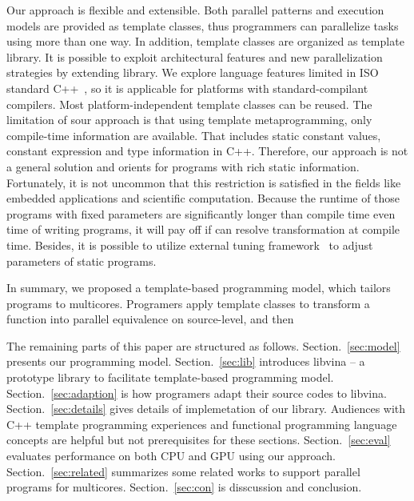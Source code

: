 Our approach is flexible and extensible. Both parallel patterns and
execution models are provided as template classes, thus programmers can
parallelize tasks using more than one way. In addition, template
classes are organized as template library. It is
possible to exploit architectural
features and new parallelization strategies by extending library. We
explore language features limited in ISO
standard C++~\cite{c++98, c++03, c++0x}, so it is applicable for
platforms with standard-compilant compilers. Most 
platform-independent template classes can be reused. The limitation of
sour approach is that using template metaprogramming, only compile-time
information are available. That includes static constant values,
constant expression and type information in C++. Therefore, our
approach is not a general solution and orients for programs with rich
static information. Fortunately, it is not uncommon that this
restriction is satisfied in the fields like embedded applications and
scientific computation. Because the runtime of those programs with fixed
parameters are significantly longer than compile time even time of
writing programs, it will pay off if can resolve transformation at
compile time. Besides, it is possible to utilize external
tuning framework~\cite{tuningfrm} to adjust parameters of static programs.

In summary, we proposed a template-based programming model, which 
tailors programs to multicores. Programers apply template classes to
transform a function into parallel equivalence on source-level, and then

The remaining parts of this paper are structured as follows.
Section.~\ref{sec:model} presents our programming model. Section.~\ref{sec:lib} introduces libvina
-- a prototype library to facilitate template-based programming model.
Section.~\ref{sec:adaption} is how programers adapt their source codes to libvina. Section.~\ref{sec:details} gives details of
implemetation of our library. Audiences with C++ template
programming experiences and functional programming language concepts
are helpful but not prerequisites for these sections. Section.~\ref{sec:eval}
evaluates performance on both CPU and GPU using our approach.
Section.~\ref{sec:related} summarizes some related works to support parallel programs
for multicores. Section.~\ref{sec:con} is disscussion and conclusion.

